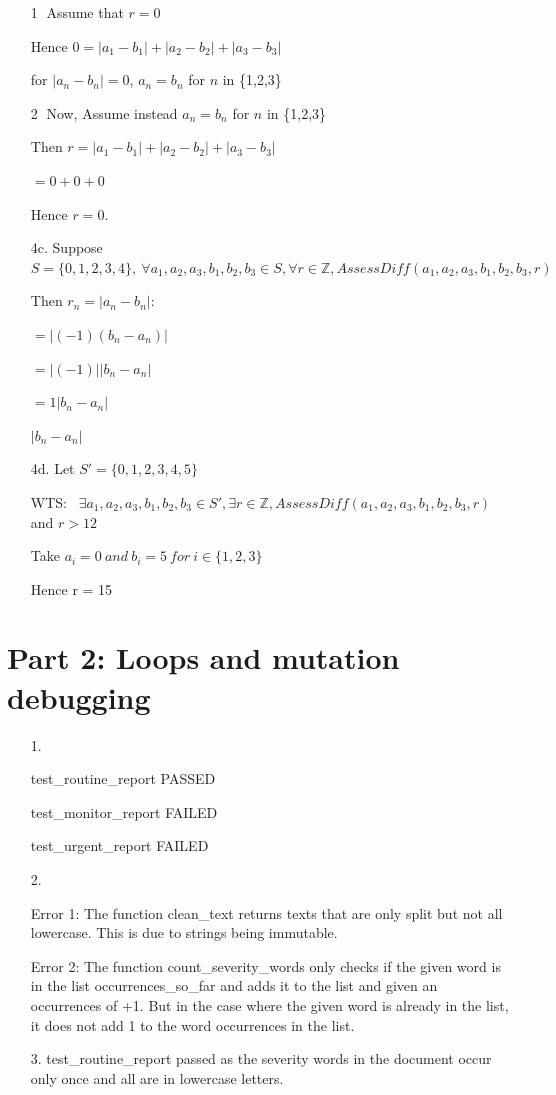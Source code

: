 \documentclass[12pt]{article}
\begin{document}
\begin{enumerate}
\textcircled{1} Assume that $r =0$

Hence $0 = |a_1-b_1| + |a_2 - b_2| + |a_3 - b_3|$

for $|a_n - b_n| = 0$, $a_n = b_n$ for $n$ in \{1,2,3\}

\textcircled{2} Now, Assume instead $a_n = b_n$ for $n$ in \{1,2,3\}

Then $r = |a_1-b_1| + |a_2 - b_2| + |a_3 - b_3|$

$= 0 + 0+ 0$

Hence $r=0$.




\item[4c.]
Suppose $S= \{0,1,2,3,4\}, \ \forall a_1, a_2, a_3, b_1, b_2, b_3 \in S, \forall r \in \mathbb{Z}, \mathit{AssessDiff}(a_1, a_2, a_3, b_1, b_2, b_3, r)$

Then $r_n = |a_n-b_n|$:

$=|(-1)(b_n-a_n)|$

$=|(-1)||b_n-a_n|$

$= 1|b_n-a_n|$

$|b_n-a_n|$





\item[4d.]
Let $S' = \{0,1,2,3,4,5\}$

WTS: \ $\exists a_1, a_2, a_3, b_1, b_2, b_3 \in S', \exists r \in \mathbb{Z}, \mathit{AssessDiff}(a_1, a_2, a_3, b_1, b_2, b_3, r)$ and $r>12$

Take $a_i = 0 \ and\  b_i = 5 \ for \ i \in \{1,2,3\}$

Hence r = 15
\end{enumerate}

\section*{Part 2: Loops and mutation debugging}

\begin{enumerate}
\item[1.]

test\_routine\_report PASSED

test\_monitor\_report FAILED

test\_urgent\_report FAILED



\item[2.]

Error 1: The function clean\_text returns texts that are only split but not all lowercase. This is due to strings being immutable.

Error 2: The function count\_severity\_words only checks if the given word is in the list
occurrences\_so\_far and adds it to the list and given an occurrences of +1. But in the case where the given word is already in the list, it does not add 1 to the word occurrences in the list.

\item[3.]
test\_routine\_report passed as the severity words in the document occur only once and all are in lowercase letters.
\end{enumerate}
\end{document}
